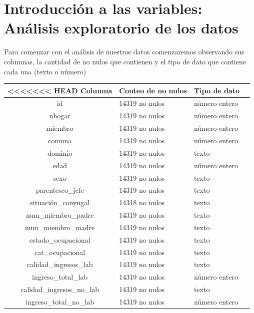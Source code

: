 \documentclass[a4paper]{article}
\begin{document}
\newpage

\section{Introducción a las variables: Análisis exploratorio de los datos}
 
    Para comenzar con el análisis de nuestros datos comenzaremos observando sus columnas, la cantidad de no nulos que contienen y el tipo de dato que contiene cada una (texto o número)
    \begin{table}[H]\begin{center}
    \begin{tabular}{clll}
<<<<<<< HEAD
    Columna                     & Conteo de no nulos & Tipo de dato \\ \hline
    id                          & 14319 no nulos & número entero \\
    nhogar                      & 14319 no nulos & número entero \\
    miembro                     & 14319 no nulos & número entero \\
    comuna                      & 14319 no nulos & número entero \\
    dominio                     & 14319 no nulos & texto \\
    edad                        & 14319 no nulos & número entero \\
    sexo                        & 14319 no nulos & texto \\
    parentesco\_jefe             & 14319 no nulos & texto \\
    situación\_conyugal          & 14318 no nulos & texto \\
    num\_miembro\_padre           & 14319 no nulos & texto \\
    num\_miembro\_madre           & 14319 no nulos & texto \\
    estado\_ocupacional          & 14319 no nulos & texto \\
    cat\_ocupacional             & 14319 no nulos & texto \\
    calidad\_ingresos\_lab        & 14319 no nulos & texto \\
    ingreso\_total\_lab           & 14319 no nulos & número entero  \\
    calidad\_ingresos\_no\_lab     & 14319 no nulos & texto \\
    ingreso\_total\_no\_lab        & 14319 no nulos & número entero  \\

\end{tabular}
\end{center}
\end{table}
\end{document}
